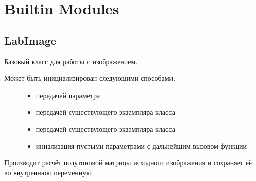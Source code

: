 \documentclass[letterpaper,10pt,russian]{sphinxmanual}
\begin{document}
\chapter{Built\sphinxhyphen{}in Modules}
\label{\detokenize{BuiltIn:built-in-modules}}\label{\detokenize{BuiltIn::doc}}

\section{LabImage}
\label{\detokenize{BaseImage:labimage}}\label{\detokenize{BaseImage::doc}}

\begin{fulllineitems}
\label{\detokenize{BaseImage:core.LabImage}}
Базовый класс для работы с изображением.
\begin{description}
\item[{Может быть инициализирован следующими способами:}] \leavevmode\begin{itemize}
\item {} 
передачей параметра 

\item {} 
передачей существующего экземпляра класса {\hyperref[\detokenize{BaseImage:core.LabImage}]{}}

\item {} 
передачей существующего экземпляра класса 

\item {} 
иниализация пустыми параметрами с дальнейшим вызовом функции {\hyperref[\detokenize{BaseImage:core.LabImage.read}]{}}

\end{itemize}

\end{description}

\begin{fulllineitems}
\label{\detokenize{BaseImage:core.LabImage.calc_grayscale_matrix}}
Производит расчёт полутоновой матрицы исходного изображения и сохраняет её во внутреннюю переменную


\end{fulllineitems}
\end{fulllineitems}
\end{document}
